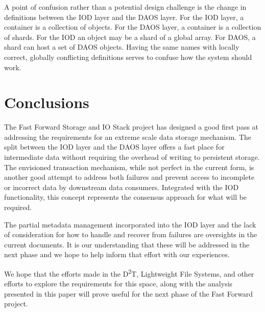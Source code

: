 \documentclass[conference]{sig-alt-gov2}
\newcommand{\DDTns}{D\textsuperscript{2}T}
\begin{document}
A point of confusion rather than a potential design challenge is the change in
definitions between the IOD layer and the DAOS layer.  For the IOD layer, a
container is a collection of objects. For the DAOS layer, a container is a
collection of shards. For the IOD an object may be a shard of a global array.
For DAOS, a shard can host a set of DAOS objects. Having the same names with
locally correct, globally conflicting definitions serves to confuse how the
system should work.

\section{Conclusions}
\label{sec:conclusion}

The Fast Forward Storage and IO Stack project has designed a good first pass at
addressing the requirements for an extreme scale data storage mechanism. The
split between the IOD layer and the DAOS layer offers a fast place for
intermediate data without requiring the overhead of writing to persistent
storage. The envisioned transaction mechanism, while not perfect in the current
form, is another good attempt to address both failures and prevent access to
incomplete or incorrect data by downstream data consumers. Integrated with the
IOD functionality, this concept represents the consensus approach for what will
be required.

The partial metadata management incorporated into the IOD layer and the lack of
consideration for how to handle and recover from failures are oversights in the
current documents. It is our understanding that these will be addressed in the
next phase and we hope to help inform that effort with our experiences.

We hope that the efforts made in the \DDTns, Lightweight File Systems, and
other efforts to explore the requirements for this space, along with the
analysis presented in this paper will prove useful for the next phase of the
Fast Forward project.
\end{document}
